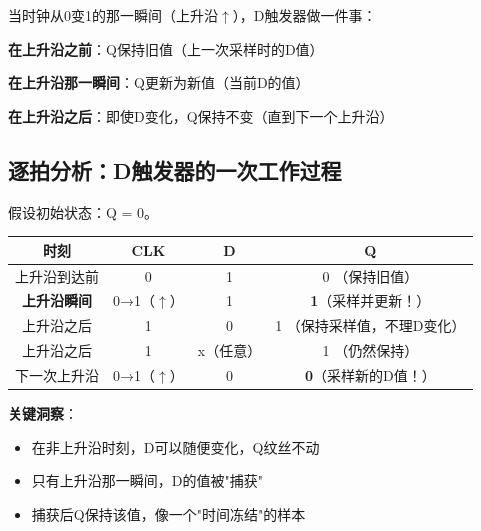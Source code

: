 当时钟从0变1的那一瞬间（上升沿$\uparrow$），D触发器做一件事：

\begin{center}
\end{center}

\textbf{在上升沿之前}：Q保持旧值（上一次采样时的D值）

\textbf{在上升沿那一瞬间}：Q更新为新值（当前D的值）

\textbf{在上升沿之后}：即使D变化，Q保持不变（直到下一个上升沿）

\subsection{逐拍分析：D触发器的一次工作过程}

假设初始状态：Q = 0。

\begin{beatanalysis}[D触发器单次采样过程]
\begin{center}
\begin{tabular}{|c|c|c|c|}
\hline
\textbf{时刻} & \textbf{CLK} & \textbf{D} & \textbf{Q} \\
\hline
上升沿到达前 & 0 & 1 & 0 （保持旧值）\\
\textbf{上升沿瞬间} & 0→1（$\uparrow$）& 1 & \textbf{1}（采样并更新！）\\
上升沿之后 & 1 & 0 & 1 （保持采样值，不理D变化）\\
上升沿之后 & 1 & x（任意）& 1 （仍然保持）\\
下一次上升沿 & 0→1（$\uparrow$）& 0 & \textbf{0}（采样新的D值！）\\
\hline
\end{tabular}
\end{center}
\end{beatanalysis}

\textbf{关键洞察}：
\begin{itemize}
  \item 在非上升沿时刻，D可以随便变化，Q纹丝不动
  \item 只有上升沿那一瞬间，D的值被"捕获"
  \item 捕获后Q保持该值，像一个"时间冻结"的样本
\end{itemize}

